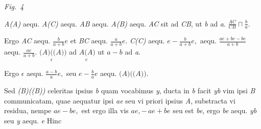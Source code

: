   \vspace*{0.5em}
  \centerline{\lbrack\textit{Fig.~4}\rbrack}%
  \label{LH_35_09_23_001-002_Fig.4}%
 \newpage%
%
\pstart%
%
\rule[-2mm]{0mm}{8mm}%
%
\textit{A(A)} aequ. \textit{A(C)} aequ. \textit{AB} aequ. \textit{A(B)}
%
%
aequ.
%
%
\quad%
\textit{AC} sit ad \textit{CB},
ut \textit{b} ad \textit{a}.
$\displaystyle\frac{AC}{CB} \sqcap \displaystyle\frac{b}{a}.$
\rule[-4mm]{0mm}{10mm}%
Ergo \textit{AC} aequ. $\displaystyle\frac{b}{a+b}e$
et \textit{BC} aequ. $\displaystyle\frac{a}{a+b}e.$
%
\textit{C(C)} aequ. $e-\displaystyle\frac{b}{a+b}e,$
aequ. $\displaystyle\frac{ae+be-be}{a+b}$
aequ. $\displaystyle\frac{ae}{a+b}$.%
\quad%
$\underset{\displaystyle\epsilon\phantom{ll}}{\displaystyle\textit{(A)((A))}}$
ad 
$\underset{\displaystyle e\phantom{l}}{\displaystyle\textit{A(A)}}$
ut $a - b$ ad \textit{a}.
\rule[-4mm]{0mm}{10mm}%
Ergo $\epsilon$ aequ. $\displaystyle\frac{a-b}{a}e,$
seu $e-\displaystyle\frac{b}{a}e$ aequ. $\textit{(A)((A))}.$
\rule[-5mm]{0mm}{3mm}%
\quad%
%
Sed \textit{(B)((B))} celeritas ipsius \textit{b}%
\protect{}
quam vocabimus \textit{y},
ducta in \textit{b}
facit \textit{yb} vim ipsi \textit{B} communicatam,%
\protect{}
quae aequatur ipsi \textit{ae}
seu vi priori ipsius \textit{A},
substracta vi residua,\protect{}
nempe $ae - be,$
est ergo illa vis $ae, -\, ae + be$
seu est \textit{be},
ergo \textit{be} aequ. \textit{yb}
seu \textit{y} aequ. \textit{e}
%
%
%
\pend%
%
\pstart%
Hinc
%
